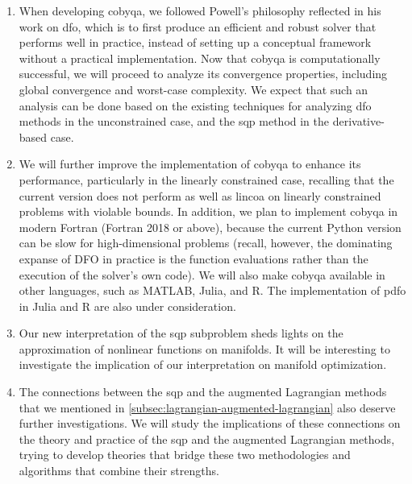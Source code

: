 \begin{enumerate}
    \item When developing \gls{cobyqa}, we followed Powell's philosophy reflected in his work on \gls{dfo}, which is to first produce an efficient and robust solver that performs well in practice, instead of setting up a conceptual framework without a practical implementation. 
    Now that \gls{cobyqa} is computationally successful, we will proceed to analyze its convergence properties, including global convergence and worst-case complexity.
    We expect that such an analysis can be done based on the existing techniques for analyzing \gls{dfo} methods in the unconstrained case, and the \gls{sqp} method in the derivative-based case.
    \item We will further improve the implementation of \gls{cobyqa} to enhance its performance, particularly in the linearly constrained case, recalling that the current version does not perform as well as \gls{lincoa} on linearly constrained problems with violable bounds.
    In addition, we plan to implement \gls{cobyqa} in modern Fortran (Fortran 2018 or above), because the current Python version can be slow for high-dimensional problems (recall, however, the dominating expanse of \gls{DFO} in practice is the function evaluations rather than the execution of the solver's own code).
    We will also make \gls{cobyqa} available in other languages, such as MATLAB, Julia, and R.
    The implementation of \gls{pdfo} in Julia and R are also under consideration.
    \item Our new interpretation of the \gls{sqp} subproblem sheds lights on the approximation of nonlinear functions on manifolds.
    It will be interesting to investigate the implication of our interpretation on manifold optimization.
    \item The connections between the \gls{sqp} and the augmented Lagrangian methods that we mentioned in \cref{subsec:lagrangian-augmented-lagrangian} also deserve further investigations.
    We will study the implications of these connections on the theory and practice of the \gls{sqp} and the augmented Lagrangian methods, trying to develop theories that bridge these two methodologies and algorithms that combine their strengths.

\end{enumerate}
